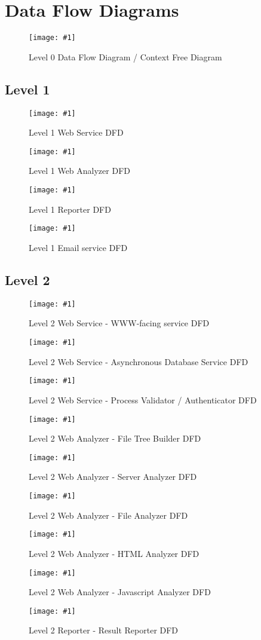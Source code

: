 \section{Data Flow Diagrams}

\newcommand{\myfig}[2]{
\begin{figure}[H]
    \texttt{[image: \#1]}
    \caption{#2}
\end{figure}
}

\myfig{dfd/level0.jpg}{Level 0 Data Flow Diagram / Context Free Diagram}
\subsection{Level 1}
\myfig{dfd/webservice_1}{Level 1 Web Service DFD}
\myfig{dfd/dfd_2_web_analyzer}{Level 1 Web Analyzer DFD}
\myfig{dfd/Reporter_3}{Level 1 Reporter DFD}
\myfig{dfd/Email_Service_4}{Level 1 Email service DFD}
\subsection{Level 2}
\myfig{dfd/webservice_1_1}{Level 2 Web Service - WWW-facing service DFD}
\myfig{dfd/webservice_1_2}{Level 2 Web Service - Asynchronous Database Service DFD}
\myfig{dfd/webservice_1_4}{Level 2 Web Service - Process Validator / Authenticator DFD}
\myfig{dfd/webanalyzer_2_1}{Level 2 Web Analyzer - File Tree Builder DFD}
\myfig{dfd/webanalyzer_2_2}{Level 2 Web Analyzer - Server Analyzer DFD}
\myfig{dfd/webanalyzer_2_3}{Level 2 Web Analyzer - File Analyzer DFD}
\myfig{dfd/webanalyzer_2_4}{Level 2 Web Analyzer - HTML Analyzer DFD}
\myfig{dfd/webanalyzer_2_5}{Level 2 Web Analyzer - Javascript Analyzer DFD}
\myfig{dfd/Reporter_3_1}{Level 2 Reporter - Result Reporter DFD}

